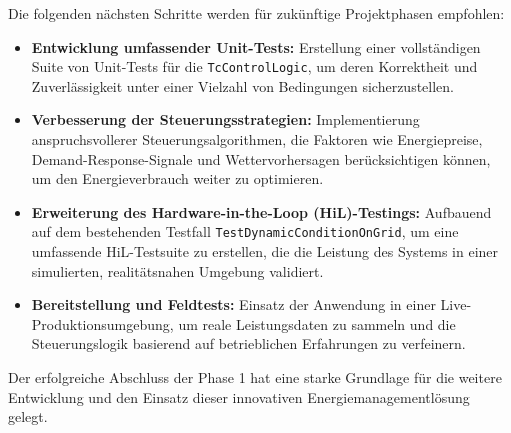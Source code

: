\documentclass{article}
\begin{document}
Die folgenden nächsten Schritte werden für zukünftige Projektphasen empfohlen:
\begin{itemize}
    \item \textbf{Entwicklung umfassender Unit-Tests:} Erstellung einer vollständigen Suite von Unit-Tests für die \texttt{TcControlLogic}, um deren Korrektheit und Zuverlässigkeit unter einer Vielzahl von Bedingungen sicherzustellen.
    \item \textbf{Verbesserung der Steuerungsstrategien:} Implementierung anspruchsvollerer Steuerungsalgorithmen, die Faktoren wie Energiepreise, Demand-Response-Signale und Wettervorhersagen berücksichtigen können, um den Energieverbrauch weiter zu optimieren.
    \item \textbf{Erweiterung des Hardware-in-the-Loop (HiL)-Testings:} Aufbauend auf dem bestehenden Testfall \texttt{TestDynamicConditionOnGrid}, um eine umfassende HiL-Testsuite zu erstellen, die die Leistung des Systems in einer simulierten, realitätsnahen Umgebung validiert.
    \item \textbf{Bereitstellung und Feldtests:} Einsatz der Anwendung in einer Live-Produktionsumgebung, um reale Leistungsdaten zu sammeln und die Steuerungslogik basierend auf betrieblichen Erfahrungen zu verfeinern.
\end{itemize}

Der erfolgreiche Abschluss der Phase 1 hat eine starke Grundlage für die weitere Entwicklung und den Einsatz dieser innovativen Energiemanagementlösung gelegt.
\end{document}
